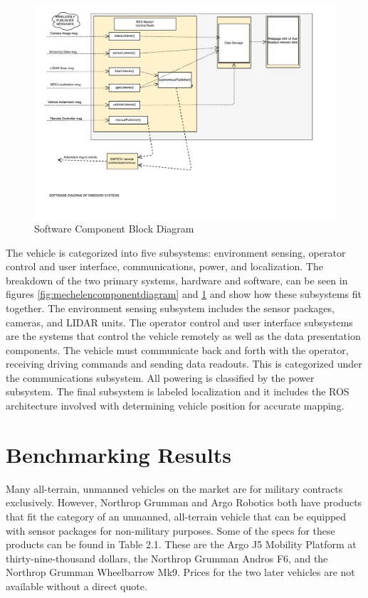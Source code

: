 \begin{figure}[H]
\centering
\includegraphics[scale=0.45]{Software_Component_Diagram}
\caption{Software Component Block Diagram}
\label{fig:softwarecomponentdiagram}
\end{figure}


The vehicle is categorized into five subsystems: environment sensing, operator control and user interface, communications, power, and localization. The breakdown of the two primary systems, hardware and software, can be seen in figures \ref{fig:mechelencomponentdiagram} and \ref{fig:softwarecomponentdiagram} and show how these subsystems fit together. The environment sensing subsystem includes the sensor packages, cameras, and LIDAR units. The operator control and user interface subsystems are the systems that control the vehicle remotely as well as the data presentation components. The vehicle must communicate back and forth with the operator, receiving driving commands and sending data readouts. This is categorized under the communications subsystem. All powering is classified by the power subsystem. The final subsystem is labeled localization and it includes the ROS architecture involved with determining vehicle position for accurate mapping. \\
%
\section{Benchmarking Results}
Many all-terrain, unmanned vehicles on the market are for military contracts exclusively. However, Northrop Grumman and Argo Robotics both have products that fit the category of an unmanned, all-terrain vehicle that can be equipped with sensor packages for non-military purposes. Some of the specs for these products can be found in Table 2.1. These are the Argo J5 Mobility Platform at thirty-nine-thousand dollars, the Northrop Grumman Andros F6, and the Northrop Grumman Wheelbarrow Mk9. Prices for the two later vehicles are not available without a direct quote. 

